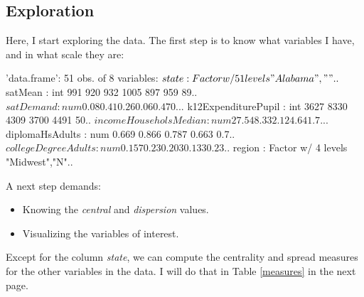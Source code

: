 \documentclass[11pt]{article}
\begin{document}
\subsection{Exploration}\label{eda}

Here, I start exploring the data. The first step is to know what variables I have, and in what scale they are:

\begin{Schunk}
\begin{Soutput}
'data.frame':	51 obs. of  8 variables:
 $ state                : Factor w/ 51 levels "Alabama",""..
 $ satMean              : int  991 920 932 1005 897 959 89..
 $ satDemand            : num  0.08 0.41 0.26 0.06 0.47 0...
 $ k12ExpenditurePupil  : int  3627 8330 4309 3700 4491 50..
 $ incomeHouseholsMedian: num  27.5 48.3 32.1 24.6 41.7 ...
 $ diplomaHsAdults      : num  0.669 0.866 0.787 0.663 0.7..
 $ collegeDegreeAdults  : num  0.157 0.23 0.203 0.133 0.23..
 $ region               : Factor w/ 4 levels "Midwest","N"..
\end{Soutput}
\end{Schunk}


A next step demands:
\begin{itemize}
  \item Knowing the \emph{central} and \emph{dispersion} values.
  \item Visualizing the variables of interest.
\end{itemize}

Except for the column \emph{state}, we can compute the centrality and spread measures for the other variables in the data. I will do that in Table \ref{measures} in the next page.
\end{document}
